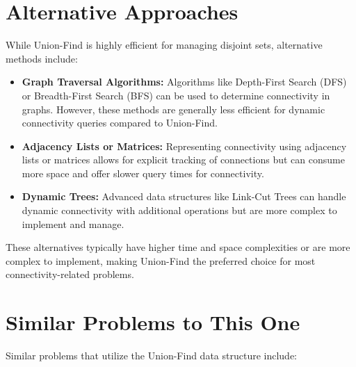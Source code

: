 \section*{Alternative Approaches}

While Union-Find is highly efficient for managing disjoint sets, alternative methods include:

\begin{itemize}
    \item \textbf{Graph Traversal Algorithms:}  
    Algorithms like Depth-First Search (DFS) or Breadth-First Search (BFS) can be used to determine connectivity in graphs. However, these methods are generally less efficient for dynamic connectivity queries compared to Union-Find.
    
    \item \textbf{Adjacency Lists or Matrices:}  
    Representing connectivity using adjacency lists or matrices allows for explicit tracking of connections but can consume more space and offer slower query times for connectivity.
    
    \item \textbf{Dynamic Trees:}  
    Advanced data structures like Link-Cut Trees can handle dynamic connectivity with additional operations but are more complex to implement and manage.
\end{itemize}

These alternatives typically have higher time and space complexities or are more complex to implement, making Union-Find the preferred choice for most connectivity-related problems.

\section*{Similar Problems to This One}

Similar problems that utilize the Union-Find data structure include:

